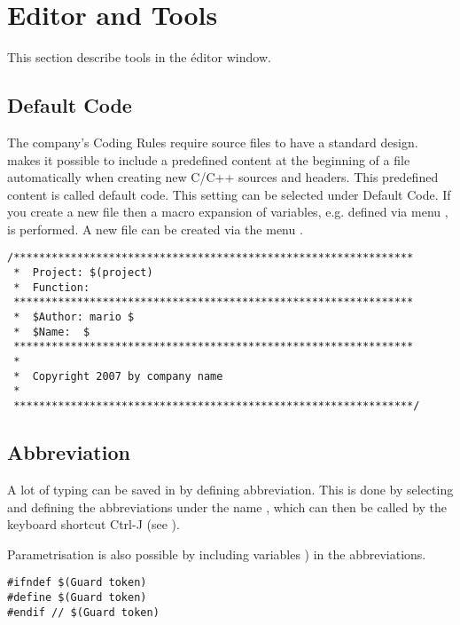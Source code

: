 \section{Editor and Tools}

This section describe tools in the éditor window.

\subsection{Default Code}

The company's Coding Rules require source files to have a standard design. \codeblocks makes it possible to include a predefined content at the beginning of a file automatically when creating new C/C++ sources and headers. This predefined content is called default code. This setting can be selected under  Default Code. If you create a new file then a macro expansion of variables, e.g. defined via menu ,  is performed. A new file can be created via the menu .


\begin{lstlisting}
/***************************************************************
 *  Project: $(project)
 *  Function:
 ***************************************************************
 *  $Author: mario $
 *  $Name:  $
 ***************************************************************
 *
 *  Copyright 2007 by company name
 *
 ***************************************************************/
\end{lstlisting}

\subsection{Abbreviation}\label{sec:abbreviation}

A lot of typing can be saved in \codeblocks by defining abbreviation. This is done by selecting  and defining the abbreviations under the name , which can then be called by the keyboard shortcut Ctrl-J (see ).


Parametrisation is also possible by including variables ) in the abbreviations.

\begin{lstlisting}
#ifndef $(Guard token)
#define $(Guard token)
#endif // $(Guard token)
\end{lstlisting}

